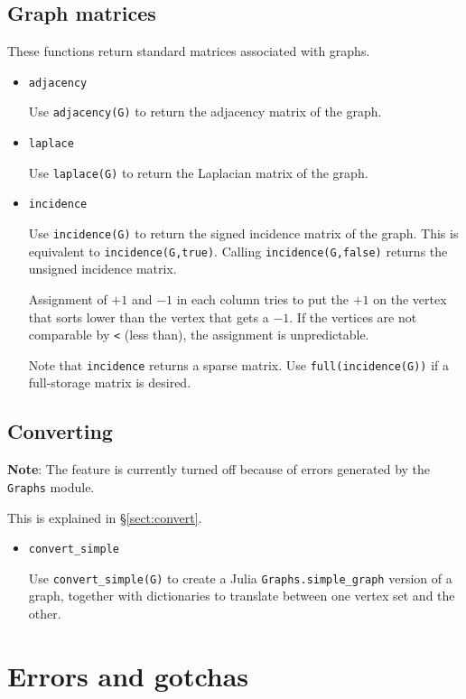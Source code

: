 \documentclass[oneside]{amsart}
\begin{document}
\subsection*{Graph matrices}

These functions return standard matrices associated with graphs.

\begin{itemize}
\item \verb|adjacency|

  Use \verb|adjacency(G)| to return the adjacency matrix of the graph.

\item \verb|laplace|

  Use \verb|laplace(G)| to return the Laplacian matrix of the graph.

\item \verb|incidence|

  Use \verb|incidence(G)| to return the signed incidence matrix of the
  graph. This is equivalent to \verb|incidence(G,true)|. Calling
  \verb|incidence(G,false)| returns the unsigned incidence matrix.

  Assignment of $+1$ and $-1$ in each column tries to put the $+1$ on
  the vertex that sorts lower than the vertex that gets a $-1$. If the
  vertices are not comparable by \verb|<| (less than), the assignment
  is unpredictable.

  Note that \verb|incidence| returns a sparse matrix. Use
  \verb|full(incidence(G))| if a full-storage matrix is desired.
\end{itemize}

\subsection*{Converting}

\textbf{Note}: The feature is currently turned off because of
errors generated by the \verb|Graphs| module.

This is explained in \S\ref{sect:convert}.

\begin{itemize}
\item \verb|convert_simple|

  Use \verb|convert_simple(G)| to create a Julia
  \verb|Graphs.simple_graph| version of a graph, together with
  dictionaries to translate between one vertex set and the other.
\end{itemize}

\section{Errors and gotchas}
\end{document}
